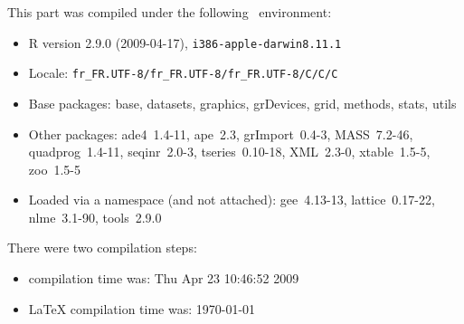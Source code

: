 \documentclass[a4paper]{article}
\begin{document}
\begin{scriptsize}

This part was compiled under the following \Rlogo{}~environment:

\begin{itemize}
  \item R version 2.9.0 (2009-04-17), \verb|i386-apple-darwin8.11.1|
  \item Locale: \verb|fr_FR.UTF-8/fr_FR.UTF-8/fr_FR.UTF-8/C/C/C|
  \item Base packages: base, datasets, graphics, grDevices, grid,
    methods, stats, utils
  \item Other packages: ade4~1.4-11, ape~2.3, grImport~0.4-3,
    MASS~7.2-46, quadprog~1.4-11, seqinr~2.0-3, tseries~0.10-18,
    XML~2.3-0, xtable~1.5-5, zoo~1.5-5
  \item Loaded via a namespace (and not attached): gee~4.13-13,
    lattice~0.17-22, nlme~3.1-90, tools~2.9.0
\end{itemize}
There were two compilation steps:

\begin{itemize}
  \item \Rlogo{} compilation time was: Thu Apr 23 10:46:52 2009
  \item \LaTeX{} compilation time was: \today
\end{itemize}

\end{scriptsize}






\end{document}
